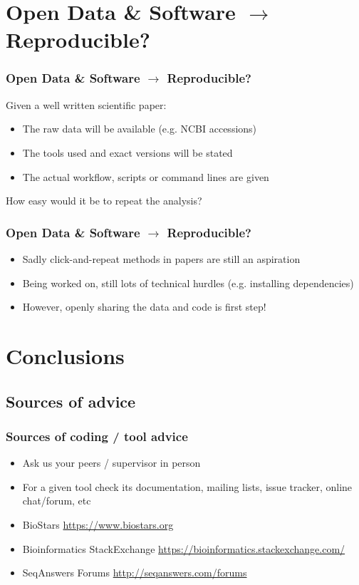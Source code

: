 \section{Open Data \& Software $\rightarrow$ Reproducible?}

\begin{frame}
  \frametitle{Open Data \& Software $\rightarrow$ Reproducible?}
  Given a well written scientific paper:
  \begin{itemize}
    \item The raw data will be available (e.g. NCBI accessions)
    \item The tools used and exact versions will be stated
    \item The actual workflow, scripts or command lines are given
  \end{itemize}
  How easy would it be to repeat the analysis?
\end{frame}


\begin{frame}
  \frametitle{Open Data \& Software $\rightarrow$ Reproducible?}
  \begin{itemize}
    \item Sadly click-and-repeat methods in papers are still an aspiration
    \item Being worked on, still lots of technical hurdles (e.g. installing dependencies)
    \item However, openly sharing the data and code is first step!
  \end{itemize}
\end{frame}

\section{Conclusions}

\subsection{Sources of advice}

\begin{frame}
  \frametitle{Sources of coding / tool advice}
  \begin{itemize}
    \item Ask us your peers / supervisor in person
    \item For a given tool check its documentation, mailing lists, issue tracker, online chat/forum, etc
    \item BioStars \url{https://www.biostars.org}
    \item Bioinformatics StackExchange \url{https://bioinformatics.stackexchange.com/}
    \item SeqAnswers Forums \url{http://seqanswers.com/forums}
 \end{itemize}
\end{frame}

